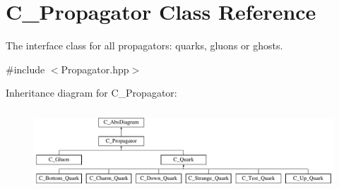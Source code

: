 \hypertarget{class_c___propagator}{\section{C\-\_\-\-Propagator Class Reference}
\label{class_c___propagator}
}


The interface class for all propagators\-: quarks, gluons or ghosts.  




{\ttfamily \#include $<$Propagator.\-hpp$>$}

Inheritance diagram for C\-\_\-\-Propagator\-:\begin{figure}[H]
\begin{center}
\leavevmode
\includegraphics[height=3.060109cm]{class_c___propagator}
\end{center}
\end{figure}

